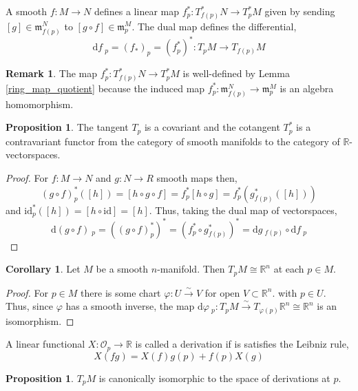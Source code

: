 \documentclass[12pt]{extarticle}
\newcommand{\R}{\mathbb{R}}
\newcommand{\id}{\mathrm{id}}
\renewcommand{\d}[1]{ \mathrm{d}#1 \:}
\theoremstyle{definition}
\newtheorem{proposition}[theorem]{Proposition}
\newtheorem{corollary}[theorem]{Corollary}
\newtheorem{remark}{Remark}
\newenvironment{definition}[1][Definition:]{\begin{trivlist}
\item[\hskip \labelsep {\bfseries #1}]}{\end{trivlist}}
\renewcommand{\O}{\mathcal{O}}
\newcommand{\m}{\mathfrak{m}}
\begin{document}
\begin{definition}
A smooth $f : M \to N$ defines a linear map $f^*_p : T_{f(p)}^* N \to T_{p}^* M$ given by sending $[g] \in \m^N_{f(p)}$ to $[g \circ f] \in \m^M_p$. The dual map defines the differential, 
\[ \d{f}_p = (f_*)_p = (f^*_p)^* : T_p M \to T_{f(p)} M \]  
\end{definition}

\begin{remark}
The map $f^*_p : T_{f(p)}^* N \to T_{p}^* M$ is well-defined by Lemma \ref{ring_map_quotient} because the induced map $f^*_p : \m_{f(p)}^N \to \m_p^M$ is an algebra homomorphism. 
\end{remark}

\begin{proposition}
The tangent $T_p$ is a covariant and the cotangent $T_p^*$ is a contravariant functor from the category of smooth manifolds to the category of $\R$-vectorspaces.  
\end{proposition}

\begin{proof}
For $f : M \to N$ and $g : N \to R$ smooth maps then, 
\[ (g \circ f)^*_p([h]) = [h \circ g \circ f] = f_p^* [h \circ g] = f_p^* (g_{f(p)}^*([h])) \]
and $\id_p^*([h]) = [h \circ \id] = [h]$. Thus, taking the dual map of vectorspaces,
\[ \d{(g \circ f)}_p = ((g \circ f)^*_p)^* = (f^*_p \circ g^*_{f(p)})^* = \d{g}_{f(p)} \circ \d{f}_p \] 
\end{proof}

\begin{corollary}
Let $M$ be a smooth $n$-manifold. Then $T_p M \cong \R^n$ at each $p \in M$.
\end{corollary}

\begin{proof}
For $p \in M$ there is some chart $\varphi : U \xrightarrow{\sim} V$ for open $V \subset \R^n$. with $p \in U$. Thus, since $\varphi$ has a smooth inverse, the map $\d{\varphi}_p : T_p M \xrightarrow{\sim} T_{\varphi(p)} \R^n \cong \R^n$ is an isomorphism.    
\end{proof}

\begin{definition}
A linear functional $X : \O_p \to \R$ is called a derivation if is satisfies the Leibniz rule, \[ X(fg) = X(f) g(p) + f(p) X(g) \] 
\end{definition}

\begin{proposition}
$T_p M$ is canonically isomorphic to the space of derivations at $p$. 
\end{proposition}
\end{document}
